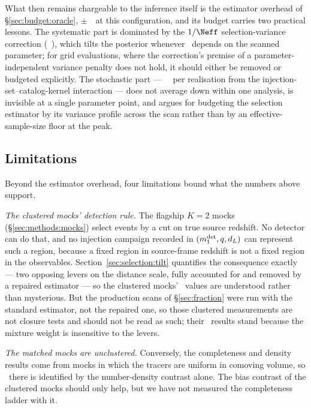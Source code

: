 What then remains chargeable to the inference itself is the estimator
overhead of \S\ref{sec:budget:oracle}, \OrcPairedOff$\pm$\OrcPairedSem~\kmsmpc\
at this configuration, and its budget carries two practical lessons. The
systematic part is dominated by the $1/\Neff$ selection-variance correction
(\OrcFarr~\kmsmpc), which tilts the posterior whenever \Neff\ depends on the
scanned parameter; for grid evaluations, where the correction's premise of a
parameter-independent variance penalty does not hold, it should either be
removed or budgeted explicitly. The stochastic part --- \OrcMuNoiseSd~\kmsmpc\
per realisation from the injection-set--catalog-kernel interaction --- does
not average down within one analysis, is invisible at a single parameter
point, and argues for budgeting the selection estimator by its variance
profile across the scan rather than by an effective-sample-size floor at the
peak.

\subsection{Limitations}
\label{sec:disc:limits}

Beyond the estimator overhead, four limitations bound what the numbers above
support.

\emph{The clustered mocks' detection rule.} The flagship $K=2$ mocks
(\S\ref{sec:methods:mocks}) select events by a cut on true source redshift. No
detector can do that, and no injection campaign recorded in
$(m_1^{\rm det}, q, d_L)$ can represent such a region, because a fixed region in
source-frame redshift is not a fixed region in the observables.
Section~\ref{sec:selection:tilt} quantifies the consequence exactly --- two
opposing levers on the distance scale, fully accounted for and removed by a
repaired estimator --- so the clustered mocks' \Hz\ values are understood
rather than mysterious. But the production scans of \S\ref{sec:fraction} were
run with the standard estimator, not the repaired one, so those clustered
measurements are not closure tests and should not be read as such; their
\fagn\ results stand because the mixture weight is insensitive to the levers.

\emph{The matched mocks are unclustered.} Conversely, the completeness and
density results come from mocks in which the tracers are uniform in comoving
volume, so \fagn\ there is identified by the number-density contrast alone. The
bias contrast of the clustered mocks should only help, but we have not measured
the completeness ladder with it.

